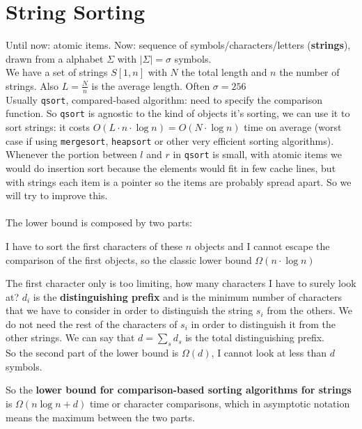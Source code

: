 \documentclass[10pt]{report}
\begin{document}
\section{String Sorting} Until now: atomic items. Now: sequence of symbols/characters/letters (\textbf{strings}), drawn from a alphabet $\Sigma$ with $|\Sigma| = \sigma$ symbols.\\
We have a set of strings $S[1,n]$ with $N$ the total length and $n$ the number of strings. Also $L=\frac{N}{n}$ is the average length. Often $\sigma = 256$\\
Usually \texttt{qsort}, compared-based algorithm: need to specify the comparison function. So \texttt{qsort} is agnostic to the kind of objects it's sorting, we can use it to sort strings: it costs $O(L\cdot n\cdot\log n) = O(N\cdot\log n)$ time on average (worst case if using \texttt{mergesort}, \texttt{heapsort} or other very efficient sorting algorithms). Whenever the portion between $l$ and $r$ in \texttt{qsort} is small, with atomic items we would do insertion sort because the elements would fit in few cache lines, but with strings each item is a pointer so the items are probably spread apart. So we will try to improve this.\\\\
The lower bound is composed by two parts: \begin{list}{}{}
	\item I have to sort the first characters of these $n$ objects and I cannot escape the comparison of the first objects, so the classic lower bound $\Omega(n\cdot\log n)$
	\item The first character only is too limiting, how many characters I have to surely look at? $d_i$ is the \textbf{distinguishing prefix} and is the minimum number of characters that we have to consider in order to distinguish the string $s_i$ from the others. We do not need the rest of the characters of $s_i$ in order to distinguish it from the other strings. We can say that $d = \sum_s d_s$ is the total distinguishing prefix.\\
	So the second part of the lower bound is $\Omega(d)$, I cannot look at less than $d$ symbols.
\end{list}
So the \textbf{lower bound for comparison-based sorting algorithms for strings} is $\Omega(n\log n + d)$ time or character comparisons, which in asymptotic notation means the maximum between the two parts.
\end{document}
